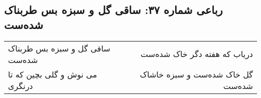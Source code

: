 \begin{center}
\section*{رباعی شماره ۳۷: ساقی گل و سبزه بس طربناک شده‌ست}
\label{sec:sh037}
\begin{longtable}{l p{0.5cm} r}
ساقی گل و سبزه بس طربناک شده‌ست
&&
دریاب که هفته دگر خاک شده‌ست
\\
می نوش و گلی بچین که تا درنگری
&&
گل خاک شده‌ست و سبزه خاشاک شده‌ست
\\
\end{longtable}
\end{center}
